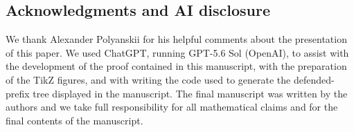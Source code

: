 \documentclass[11pt]{amsart}
\theoremstyle{definition}
\begin{document}
\subsection*{Acknowledgments and AI disclosure}
We thank Alexander Polyanskii for his helpful comments about the presentation of this paper. We used ChatGPT, running GPT-5.6 Sol (OpenAI), to assist with the development of the proof contained in this manuscript, with the preparation of the TikZ figures, and with writing the code used to generate the defended-prefix tree displayed in the manuscript. The final manuscript was written by the authors and we take full responsibility for all mathematical claims and for the final contents of the manuscript.

   
\end{document}
